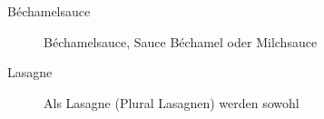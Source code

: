 \begin{description}
  \item [Béchamelsauce] Béchamelsauce, Sauce Béchamel oder Milchsauce %
  \item [Lasagne] Als Lasagne (Plural Lasagnen) werden sowohl %
\end{description}


